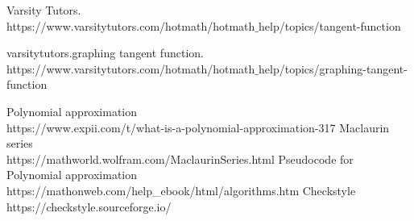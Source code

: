 \documentclass[letterpaper, 11pt]{report}
\begin{document}
\begin{thebibliography}{}
Varsity Tutors.
\\https://www.varsitytutors.com/hotmath/hotmath$\_$help/topics/tangent-function

varsitytutors.graphing tangent function. 
\\https://www.varsitytutors.com/hotmath/hotmath$\_$help/topics/graphing-tangent-function

Polynomial approximation
\\https://www.expii.com/t/what-is-a-polynomial-approximation-317
Maclaurin series
\\https://mathworld.wolfram.com/MaclaurinSeries.html
Pseudocode for Polynomial approximation\\https://mathonweb.com/help\_ebook/html/algorithms.htm
Checkstyle\\
https://checkstyle.sourceforge.io/
\end{thebibliography}
\end{document}
